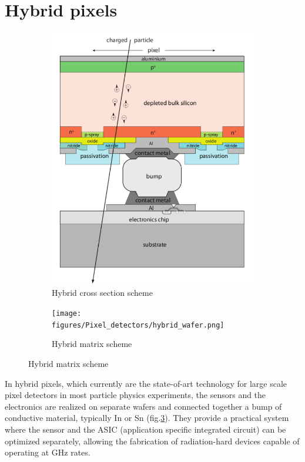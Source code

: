 \section{Hybrid pixels}
   \begin{figure}
      \centering
      \begin{subfigure}[b]{0.49\textwidth}
         \centering
         \includegraphics[width=0.75\linewidth]{figures/Pixel_detectors/hybrid_scheme.png} 
         \caption{Hybrid cross section scheme}
         \label{fig:hybrid_scheme}
      \end{subfigure}
      \hfill
         \begin{subfigure}[b]{0.49\textwidth}
            \centering
            \texttt{[image: figures/Pixel\_detectors/hybrid\_wafer.png]}
            \caption{Hybrid matrix scheme}
            \label{fig:hybrid_wafer}
         \end{subfigure}
         \label{fig:hybrid}
   \end{figure}
   In hybrid pixels, which currently are the state-of-art technology for large scale pixel detectors in most particle physics experiments, the sensors and the electronics are realized on separate wafers and connected together a bump of conductive material, typically In or Sn  (fig.\ref{fig:hybrid}). 
   They provide a practical system where the sensor and the ASIC (application specific integrated circuit) can be optimized separately, allowing the fabrication of radiation-hard devices capable of operating at \si{GHz} rates.
